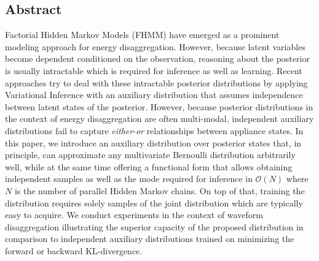 

\subsection{Abstract}
Factorial Hidden Markov Models (FHMM) have emerged as a prominent modeling approach for energy disaggregation. However, because latent variables become dependent conditioned on the observation, reasoning about the posterior is usually intractable which is required for inference as well as learning. Recent approaches try to deal with these intractable posterior distributions by applying Variational Inference with an auxiliary distribution that assumes independence between latent states of the posterior. However, because posterior distributions in the context of energy disaggregation are often multi-modal, independent auxiliary distributions fail to capture \emph{either}-\emph{or} relationships between appliance states. In this paper, we introduce an auxiliary distribution over posterior states that, in principle, can approximate any multivariate Bernoulli distribution arbitrarily well, while at the same time offering a functional form that allows obtaining independent samples as well as the mode required for inference in $\mathcal{O}(N)$ where $N$ is the number of parallel Hidden Markov chains. On top of that, training the distribution requires solely samples of the joint distribution which are typically easy to acquire. We conduct experiments in the context of waveform disaggregation illustrating the superior capacity of the proposed distribution in comparison to independent auxiliary distributions trained on minimizing the forward or backward KL-divergence.


